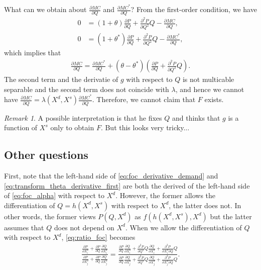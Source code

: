 \documentclass[11pt, a4paper]{article}
\theoremstyle{remark}
\newtheorem{remark}{Remark}
\begin{document}
What can we obtain about $\frac{\partial MC}{\partial Q}$ and $\frac{\partial MC^{*}}{\partial Q}$?
From the first-order condition, we have
\begin{align}
    0 &= (1+\theta)\frac{\partial P}{\partial Q} + \frac{\partial^2 P}{\partial Q^2}Q - \frac{\partial MC}{\partial Q},\\
    0 &= (1+\theta^{*})\frac{\partial P}{\partial Q} + \frac{\partial^2 P}{\partial Q^2}Q - \frac{\partial MC^{*}}{\partial Q},
\end{align}
which implies that 
\begin{align}
    \frac{\partial MC}{\partial Q} = \frac{\partial MC^{*}}{\partial Q} + (\theta - \theta^{*}) \left(\frac{\partial P}{\partial Q} + \frac{\partial^2 P}{\partial Q^2}Q \right).
\end{align}
The second term and the derivatie of $g$ with respect to $Q$ is not multicable separable and the second term does not coincide with $\lambda$, and hence we cannot have $\frac{\partial MC}{\partial Q} = \lambda(X^{d}, X^{s}) \frac{\partial MC^{*}}{\partial Q}$.
Therefore, we cannot claim that $F$ exists.

\begin{remark}
    A possible interpretation is that he fixes $Q$ and thinks that $g$ is a function of $X^{s}$ only to obtain $F$. But this looks very tricky...
\end{remark}



\subsection{Other questions}
First, note that the left-hand side of \eqref{eq:foc_derivative_demand} and \eqref{eq:transform_theta_derivative_first} are both the derived of the left-hand side of \eqref{eq:foc_alpha} with respect to $X^{d}$.
However, the former allows the differentiation of $Q = h(X^{d}, X^{s})$ with respect to $X^{d}$, the latter does not.
In other words, the former views $P(Q, X^{d})$ as $f(h(X^{d}, X^{s}), X^{d})$ but the latter assumes that $Q$ does not depend on $X^{d}$.
When we allow the differentiation of $Q$ with respect to $X^{d}$, \eqref{eq:ratio_foc} becomes
\begin{align}
    \frac{\frac{\partial P}{\partial X^{d}_{i}} + \frac{\partial P}{\partial Q} \frac{\partial Q}{\partial X^{d}_{i}}}{\frac{\partial P}{\partial X^{d}_{j}} + \frac{\partial P}{\partial Q} \frac{\partial Q}{\partial X^{d}_{j}}} = \frac{\frac{\partial P}{\partial Q}\frac{\partial Q}{\partial X^{d}_{i}}  + \frac{\partial^2 P}{\partial Q^2}Q\frac{\partial Q}{\partial X^{d}_{i}} + \frac{\partial^2 P}{\partial X^{d}_{i}\partial Q}Q }{\frac{\partial P}{\partial Q}\frac{\partial Q}{\partial X^{d}_{j}}  + \frac{\partial^2 P}{\partial Q^2}Q\frac{\partial Q}{\partial X^{d}_{j}} + \frac{\partial^2 P}{\partial X^{d}_{j}\partial Q}Q }.
\end{align}
\end{document}
